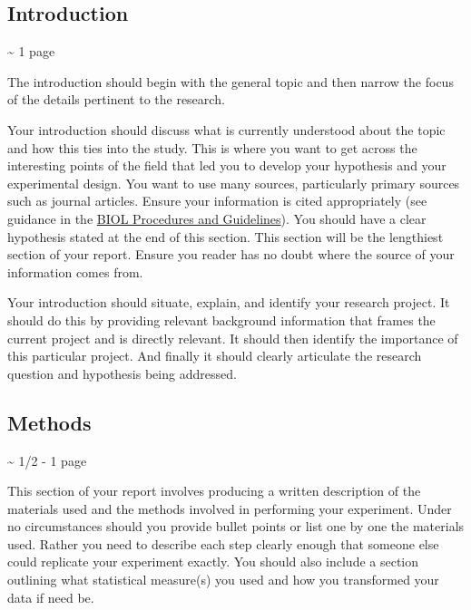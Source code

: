 \documentclass[
]{book}
\begin{document}
\hypertarget{introduction}{%
\subsection*{Introduction}\label{introduction}}

\textasciitilde{} 1 page

The introduction should begin with the general topic and then narrow the focus of the details pertinent to the research.

Your introduction should discuss what is currently understood about the topic and how this ties into the study. This is where you want to get across the interesting points of the field that led you to develop your hypothesis and your experimental design. You want to use many sources, particularly primary sources such as journal articles. Ensure your information is cited appropriately (see guidance in the \href{https://ubco-biology.github.io/Procedures-and-Guidelines/apa-citations.html}{BIOL Procedures and Guidelines}). You should have a clear hypothesis stated at the end of this section. This section will be the lengthiest section of your report. Ensure you reader has no doubt where the source of your information comes from.

Your introduction should situate, explain, and identify your research project. It should do this by providing relevant background information that frames the current project and is directly relevant. It should then identify the importance of this particular project. And finally it should clearly articulate the research question and hypothesis being addressed.

\hypertarget{methods}{%
\subsection*{Methods}\label{methods}}

\textasciitilde{} 1/2 - 1 page

This section of your report involves producing a written description of the materials used and the methods involved in performing your experiment. Under no circumstances should you provide bullet points or list one by one the materials used. Rather you need to describe each step clearly enough that someone else could replicate your experiment exactly. You should also include a section outlining what statistical measure(s) you used and how you transformed your data if need be.
\end{document}
